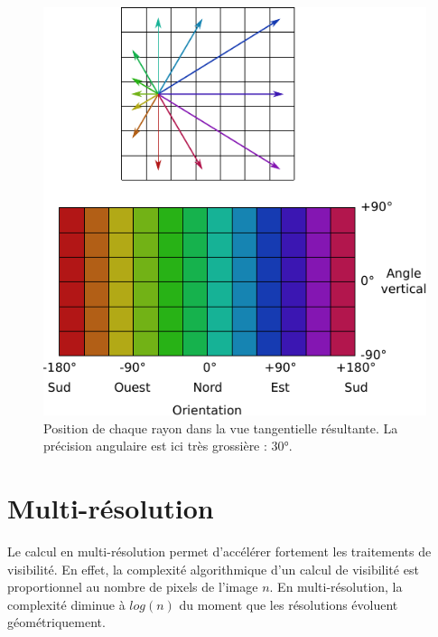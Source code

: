 \documentclass{report}
\begin{document}
\begin{figure}[H]
	\includegraphics{img/grid_tan_result.pdf} 
	\caption{Position de chaque rayon dans la vue tangentielle résultante. La précision angulaire est ici très grossière : 30°.}
	\label{grid_tan_result}
\end{figure}

\section{Multi-résolution}
\label{multires}
Le calcul en multi-résolution permet d'accélérer fortement les traitements de visibilité. En effet, la complexité algorithmique d'un calcul de visibilité est proportionnel au nombre de pixels de l'image $n$. En multi-résolution, la complexité diminue à $log(n)$ du moment que les résolutions évoluent géométriquement.
\end{document}
